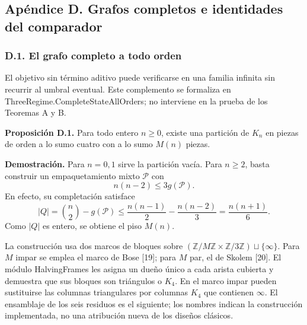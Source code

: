 \documentclass[spanish,11pt,a4paper]{article}
\begin{document}
\subsection{Apéndice D. Grafos completos e identidades del comparador}\label{apendice-d.-grafos-completos-e-identidades-del-comparador}

\subsubsection{D.1. El grafo completo a todo orden}\label{d.1.-el-grafo-completo-a-todo-orden}

El objetivo sin término aditivo puede verificarse en una familia infinita sin recurrir al umbral eventual. Este complemento se formaliza en {\ttfamily\small ThreeRegime.\discretionary{\hbox{\ensuremath{\hookrightarrow}}}{}{}CompleteStat\discretionary{\hbox{\ensuremath{\hookrightarrow}}}{}{}eAllOrders}; no interviene en la prueba de los Teoremas A y B.

\textbf{Proposición D.1.} Para todo entero \(n\ge0\), existe una partición de \(K_n\) en piezas de orden a lo sumo cuatro con a lo sumo \(M(n)\) piezas.

\textbf{Demostración.} Para \(n=0,1\) sirve la partición vacía. Para \(n\ge2\), basta construir un empaquetamiento mixto \(\mathcal P\) con \[
n(n-2)\le3g(\mathcal P).
\tag{D.1}
\] En efecto, su completación satisface \[
|Q|=\binom n2-g(\mathcal P)
\le\frac{n(n-1)}2-\frac{n(n-2)}3
=\frac{n(n+1)}6.
\tag{D.2}
\] Como \(|Q|\) es entero, se obtiene el piso \(M(n)\).

La construcción usa dos marcos de bloques sobre \((\mathbb Z/M\mathbb Z\times\mathbb Z/3\mathbb Z)\sqcup\{\infty\}\). Para \(M\) impar se emplea el marco de Bose {[}19{]}; para \(M\) par, el de Skolem {[}20{]}. El módulo {\ttfamily\small HalvingFrame\discretionary{\hbox{\ensuremath{\hookrightarrow}}}{}{}s} les asigna un dueño único a cada arista cubierta y demuestra que sus bloques son triángulos o \(K_4\). En el marco impar pueden sustituirse las columnas triangulares por columnas \(K_4\) que contienen \(\infty\). El ensamblaje de los seis residuos es el siguiente; los nombres indican la construcción implementada, no una atribución nueva de los diseños clásicos.

\end{document}
